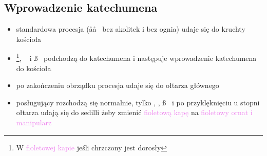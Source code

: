 \hrulefill

\subsection{Wprowadzenie katechumena}
\begin{itemize}
	\item standardowa procesja (\aa\aa~ bez akolitek i bez ognia) udaje się do
	      kruchty kościoła
	\item \ii \footnote{W \textcolor{violet}{fioletowej kapie} jeśli chrzczony
		      jest dorosły}, \dd~ i \ss~ podchodzą do katechumena i następuje
	      wprowadzenie katechumena do kościoła
	\item po zakończeniu obrządku procesja udaje się do ołtarza głównego
	\item posługujący rozchodzą się normalnie, tylko \ii, \dd, \ss~ i  po
	      przyklęknięciu u stopni ołtarza udają się do sedilli żeby zmienić
	      \textcolor{violet}{fioletową kapę} na
	      \textcolor{violet}{fioletowy ornat i manipularz}
\end{itemize}

\hrulefill


